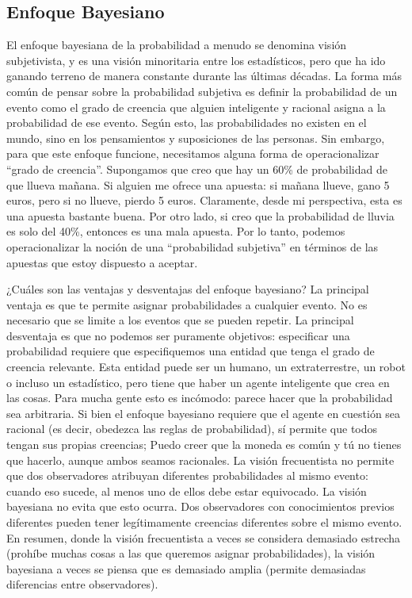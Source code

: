 \documentclass[
]{book}
\begin{document}
\hypertarget{enfoque-bayesiano}{%
\subsection{Enfoque Bayesiano}\label{enfoque-bayesiano}}

El enfoque bayesiana de la probabilidad a menudo se denomina visión subjetivista, y es una visión minoritaria entre los estadísticos, pero que ha ido ganando terreno de manera constante durante las últimas décadas. La forma más común de pensar sobre la probabilidad subjetiva es definir la probabilidad de un evento como el grado de creencia que alguien inteligente y racional asigna a la probabilidad de ese evento. Según esto, las probabilidades no existen en el mundo, sino en los pensamientos y suposiciones de las personas. Sin embargo, para que este enfoque funcione, necesitamos alguna forma de operacionalizar ``grado de creencia''. Supongamos que creo que hay un 60\% de probabilidad de que llueva mañana. Si alguien me ofrece una apuesta: si mañana llueve, gano 5 euros, pero si no llueve, pierdo 5 euros. Claramente, desde mi perspectiva, esta es una apuesta bastante buena. Por otro lado, si creo que la probabilidad de lluvia es solo del 40\%, entonces es una mala apuesta. Por lo tanto, podemos operacionalizar la noción de una ``probabilidad subjetiva'' en términos de las apuestas que estoy dispuesto a aceptar.

¿Cuáles son las ventajas y desventajas del enfoque bayesiano? La principal ventaja es que te permite asignar probabilidades a cualquier evento. No es necesario que se limite a los eventos que se pueden repetir. La principal desventaja es que no podemos ser puramente objetivos: especificar una probabilidad requiere que especifiquemos una entidad que tenga el grado de creencia relevante. Esta entidad puede ser un humano, un extraterrestre, un robot o incluso un estadístico, pero tiene que haber un agente inteligente que crea en las cosas. Para mucha gente esto es incómodo: parece hacer que la probabilidad sea arbitraria. Si bien el enfoque bayesiano requiere que el agente en cuestión sea racional (es decir, obedezca las reglas de probabilidad), sí permite que todos tengan sus propias creencias; Puedo creer que la moneda es común y tú no tienes que hacerlo, aunque ambos seamos racionales. La visión frecuentista no permite que dos observadores atribuyan diferentes probabilidades al mismo evento: cuando eso sucede, al menos uno de ellos debe estar equivocado. La visión bayesiana no evita que esto ocurra. Dos observadores con conocimientos previos diferentes pueden tener legítimamente creencias diferentes sobre el mismo evento. En resumen, donde la visión frecuentista a veces se considera demasiado estrecha (prohíbe muchas cosas a las que queremos asignar probabilidades), la visión bayesiana a veces se piensa que es demasiado amplia (permite demasiadas diferencias entre observadores).
\end{document}
